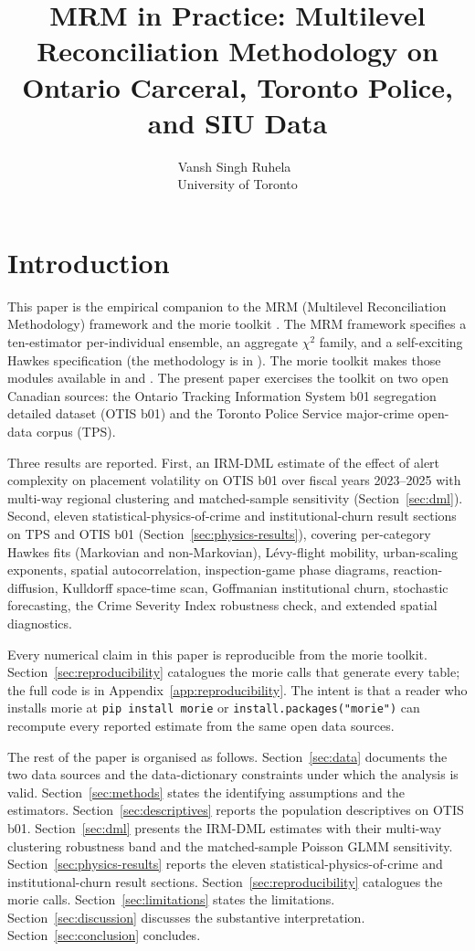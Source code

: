 \documentclass[article,shortnames,nojss]{jss}
\title{MRM in Practice: Multilevel Reconciliation Methodology on Ontario Carceral, Toronto Police, and SIU Data}
\author{Vansh Singh Ruhela~\orcidlink{0009-0004-1750-3592}\\University of Toronto}
\newcommand{\OTIS}{\textsf{OTIS}}
\newcommand{\TPS}{\textsf{TPS}}
\begin{document}
\sloppy

\clearpage

\section{Introduction}
\label{sec:intro}

This paper is the empirical companion to the MRM (Multilevel Reconciliation Methodology)
framework \citep{Ruhela2026MRM} and the morie toolkit
\citep{Ruhela2026MorieR, Ruhela2026MoriePy}. The MRM framework
specifies a ten-estimator per-individual ensemble, an aggregate
$\chi^{2}$ family, and a self-exciting Hawkes specification (the methodology is in
\citealt{Ruhela2026Hawkes}). The morie toolkit makes those modules
available in  and . The present paper
exercises the toolkit on two open Canadian sources: the Ontario
Tracking Information System b01 segregation detailed dataset
(\OTIS{} b01) and the Toronto Police Service major-crime open-data
corpus (\TPS{}).

Three results are reported. First, an IRM-DML estimate of the effect
of alert complexity on placement volatility on \OTIS{} b01 over fiscal
years 2023--2025 with multi-way regional clustering and matched-sample
sensitivity (Section~\ref{sec:dml}). Second, eleven statistical-physics-of-crime and institutional-churn
result sections on \TPS{} and \OTIS{} b01 (Section~\ref{sec:physics-results}),
covering per-category Hawkes fits (Markovian and non-Markovian),
L\'evy-flight mobility, urban-scaling exponents, spatial autocorrelation,
inspection-game phase diagrams, reaction-diffusion, Kulldorff
space-time scan, Goffmanian institutional churn, stochastic forecasting,
the Crime Severity Index robustness check, and extended spatial
diagnostics.

Every numerical claim in this paper is reproducible from the morie
toolkit. Section~\ref{sec:reproducibility} catalogues the morie
calls that generate every table; the full code is in
Appendix~\ref{app:reproducibility}. The intent is that a reader who
installs morie at \texttt{pip install morie} or
\texttt{install.packages("morie")} can recompute every reported
estimate from the same open data sources.

The rest of the paper is organised as follows.
Section~\ref{sec:data} documents the two data sources and the
data-dictionary constraints under which the analysis is valid.
Section~\ref{sec:methods} states the identifying assumptions and the
estimators. Section~\ref{sec:descriptives} reports the population
descriptives on \OTIS{} b01. Section~\ref{sec:dml} presents the IRM-DML
estimates with their multi-way clustering robustness band and the
matched-sample Poisson GLMM sensitivity. Section~\ref{sec:physics-results} reports the eleven
statistical-physics-of-crime and institutional-churn result sections.
Section~\ref{sec:reproducibility} catalogues the morie calls.
Section~\ref{sec:limitations} states the limitations.
Section~\ref{sec:discussion} discusses the substantive interpretation.
Section~\ref{sec:conclusion} concludes.
\end{document}
